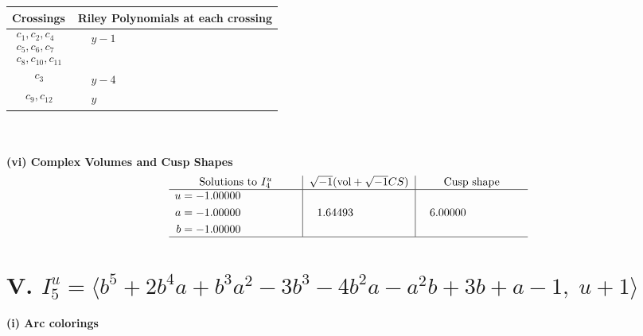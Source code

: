 \documentclass[1p]{elsarticle_modified}
\theoremstyle{definition}
\newcommand{\I}{\sqrt{-1}}
\begin{document}
\begin{tabular}{m{50pt}|m{274pt}}
Crossings & \hspace{64pt}Riley Polynomials at each crossing \\
\hline $$\begin{aligned}c_{1},c_{2},c_{4}\\c_{5},c_{6},c_{7}\\c_{8},c_{10},c_{11}\end{aligned}$$&$\begin{aligned}
&y-1
\end{aligned}$\\
\hline $$\begin{aligned}c_{3}\end{aligned}$$&$\begin{aligned}
&y-4
\end{aligned}$\\
\hline $$\begin{aligned}c_{9},c_{12}\end{aligned}$$&$\begin{aligned}
&y
\end{aligned}$\\
\hline
\end{tabular}\\~\\
\newpage\flushleft \textbf{(vi) Complex Volumes and Cusp Shapes}
$$\begin{array}{c|c|c}  
\text{Solutions to }I^u_{4}& \I (\text{vol} + \sqrt{-1}CS) & \text{Cusp shape}\\
 \hline 
\begin{aligned}
u &= -1.00000\phantom{ +0.000000I} \\
a &= -1.00000\phantom{ +0.000000I} \\
b &= -1.00000\phantom{ +0.000000I}\end{aligned}
 & \phantom{-}1.64493\phantom{ +0.000000I} & \phantom{-}6.00000\phantom{ +0.000000I}\\
 \hline 
 \end{array}$$\newpage\newpage\renewcommand{\arraystretch}{1}
\centering \section*{V. $I^u_{5}= \langle b^5+2 b^4 a+b^3 a^2-3 b^3-4 b^2 a- a^2 b+3 b+a-1,\;u+1 \rangle$}
\flushleft \textbf{(i) Arc colorings}\\
\end{document}
